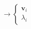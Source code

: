 \documentclass[preview]{standalone}
\begin{document}
\begin{align*}
\to \begin{cases} \bm v_i\\ \lambda_i \end{cases}
\end{align*}
\end{document}
